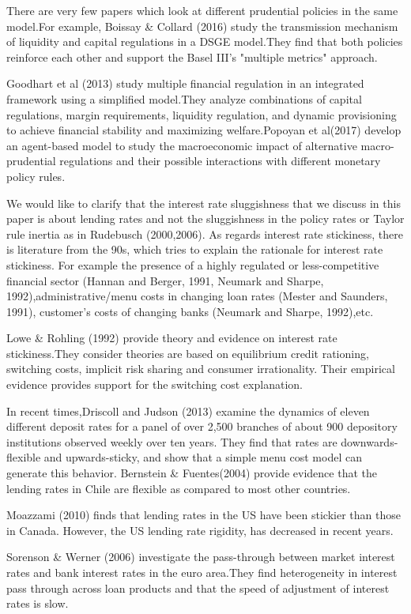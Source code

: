\documentclass[12pt]{article}
\numberwithin{equation}{section}
\begin{document}
There are very few papers which look at different prudential policies in the same model.For example, Boissay \& Collard (2016) study the transmission mechanism of liquidity and capital regulations in a DSGE model.They find that both policies reinforce each other and support the Basel III's "multiple metrics" approach.

Goodhart et al (2013) study multiple financial regulation in an integrated framework using a simplified model.They analyze combinations of capital regulations, margin requirements, liquidity regulation, and dynamic provisioning to achieve financial stability and maximizing welfare.Popoyan et al(2017) develop an agent-based model to study the macroeconomic impact of alternative macro-prudential regulations and their possible interactions with different monetary policy rules.


We would like to clarify that the interest rate sluggishness that we discuss in this paper is about lending rates and not the sluggishness in the policy rates or Taylor rule inertia as in Rudebusch (2000,2006).
As regards interest rate stickiness, there is literature from the 90s, which tries to explain the rationale for interest rate stickiness. For example  the presence of a highly regulated or less-competitive financial sector (Hannan and Berger, 1991, Neumark and Sharpe, 1992),administrative/menu costs in changing loan rates (Mester and Saunders, 1991), customer’s costs of changing banks (Neumark and Sharpe, 1992),etc.


Lowe \& Rohling (1992) provide theory and evidence on interest rate stickiness.They consider theories are based on equilibrium credit rationing, switching costs, implicit risk sharing and consumer irrationality. Their empirical evidence provides support for the switching cost explanation.

In recent times,Driscoll and Judson (2013) examine the dynamics of eleven different deposit rates for a panel of over 2,500 branches of about 900 depository institutions observed weekly over ten years. They find that rates are downwards-flexible and upwards-sticky, and show that a simple menu cost model can generate this behavior. Bernstein \& Fuentes(2004) provide evidence that the lending rates in Chile are flexible as compared to most other countries.

Moazzami (2010) finds that lending rates in the US have been stickier than those in Canada. However, the US lending rate rigidity, has decreased in recent years.

Sorenson \& Werner (2006) investigate the pass-through between market interest rates and bank interest rates in the euro area.They find heterogeneity in interest pass through across loan products and that the speed of adjustment of interest rates is slow.
\end{document}
